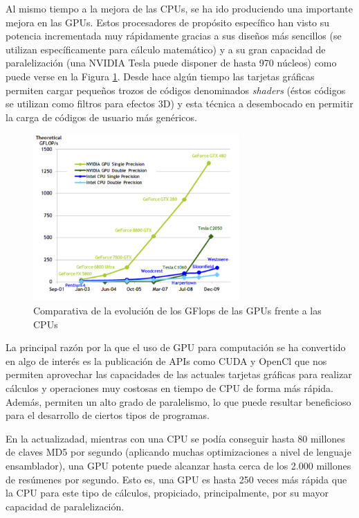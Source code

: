 Al mismo tiempo a la mejora de las CPUs, se ha ido produciendo una importante mejora en las GPUs. Estos procesadores de propósito específico han visto su potencia incrementada muy rápidamente gracias a sus diseños más sencillos (se utilizan específicamente para cálculo matemático) y a su gran capacidad de paralelización (una NVIDIA Tesla puede disponer de hasta 970 núcleos) como puede verse en la Figura \ref{fig:GPUvsCPU}. Desde hace algún tiempo las tarjetas gráficas permiten cargar pequeños trozos de códigos denominados \emph{shaders} (éstos códigos se utilizan como filtros para efectos 3D) y esta técnica a desembocado en permitir la carga de códigos de usuario más genéricos.

\begin{figure}
	\centering
	\includegraphics[width=0.7\textwidth]{evolucion-gpu.png}
	\caption{Comparativa de la evolución de los GFlops de las GPUs frente a las CPUs\cite{nvidia:cuda_c_programming_guide}}\label{fig:GPUvsCPU}
\end{figure}

La principal razón por la que el uso de GPU para computación se ha convertido en algo de interés es la publicación de APIs como CUDA y OpenCl que nos permiten aprovechar las capacidades de las actuales tarjetas gráficas para realizar cálculos y operaciones muy costosas en tiempo de CPU de forma más rápida. Además, permiten un alto grado de paralelismo, lo que puede resultar beneficioso para el desarrollo de ciertos tipos de programas.

En la actualizadad, mientras con una CPU se podía conseguir hasta 80 millones de claves MD5 por segundo (aplicando muchas optimizaciones a nivel de lenguaje ensamblador), una GPU potente puede alcanzar hasta cerca de los 2.000 millones de resúmenes por segundo. Esto es, una GPU es hasta 250 veces más rápida que la CPU para este tipo de cálculos, propiciado, principalmente, por su mayor capacidad de paralelización.

